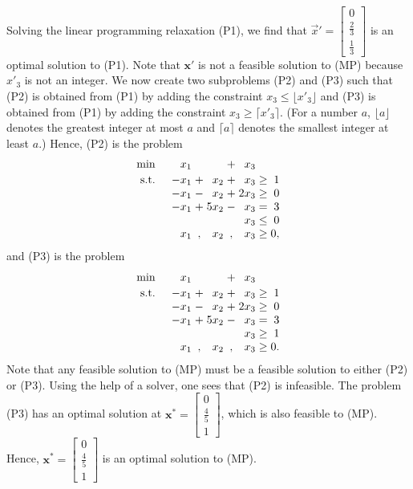Solving the linear programming relaxation (P1), we find that
\(\vec{x}' = \begin{bmatrix}0\\ \frac{2}{3}\\ \frac{1}{3}\end{bmatrix}\)
is an optimal solution to (P1). Note that \(\mathbf{x}'\) is not a
feasible solution to (MP) because \(x'_3\) is not an integer. We now
create two subproblems (P2) and (P3) such that (P2) is obtained from
(P1) by adding the constraint \(x_3 \leq \lfloor x'_3\rfloor\) and (P3)
is obtained from (P1) by adding the constraint
\(x_3 \geq \lceil x'_3\rceil\). (For a number \(a\),
\(\lfloor a \rfloor\) denotes the greatest integer at most \(a\) and
\(\lceil a \rceil\) denotes the smallest integer at least \(a\).) Hence,
(P2) is the problem \[
\begin{array}{l r@{\;}c@{\;}r@{\;}c@{\;}r@{\;}c@{\;}r}
\min & x_1  &   &      & + & x_3  &      &   \\[2pt]
\st  & -x_1 & + &  x_2 & + &  x_3 & \geq & 1 \\
     & -x_1 & - &  x_2 & + & 2x_3 & \geq & 0 \\
     & -x_1 & + & 5x_2 & - &  x_3 & =    & 3 \\
     &      &   &      &   &  x_3 & \leq & 0 \\
     &  x_1 & , &  x_2 & , &  x_3 & \geq & 0,
\end{array}
\] and (P3) is the problem \[
\begin{array}{l r@{\;}c@{\;}r@{\;}c@{\;}r@{\;}c@{\;}r}
\min & x_1  &   &      & + & x_3  &      &   \\[2pt]
\st  & -x_1 & + &  x_2 & + &  x_3 & \geq & 1 \\
     & -x_1 & - &  x_2 & + & 2x_3 & \geq & 0 \\
     & -x_1 & + & 5x_2 & - &  x_3 & =    & 3 \\
     &      &   &      &   &  x_3 & \geq & 1 \\
     &  x_1 & , &  x_2 & , &  x_3 & \geq & 0.
\end{array}
\] Note that any feasible solution to (MP) must be a feasible
solution to either (P2) or (P3). Using the help of a solver, one sees
that (P2) is infeasible. The problem (P3) has an optimal solution at
\(\mathbf{x}^* = \begin{bmatrix}0\\ \frac{4}{5}\\ 1\end{bmatrix}\),
which is also feasible to (MP). Hence,
\(\mathbf{x}^* = \begin{bmatrix}0\\ \frac{4}{5}\\ 1\end{bmatrix}\) is an
optimal solution to (MP).

